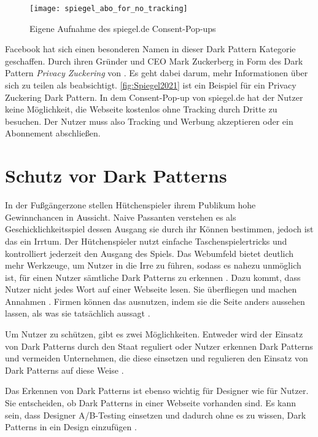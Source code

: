 \documentclass[conference,compsoc,final,a4paper]{IEEEtran}
\begin{document}
\begin{figure}[!ht]
  \centering
  \texttt{[image: spiegel\_abo\_for\_no\_tracking]}
  \caption{Eigene Aufnahme des spiegel.de Consent-Pop-ups~\autocite{Spiegel2021}}
  \label{fig:Spiegel2021}
\end{figure}

Facebook hat sich einen besonderen Namen in dieser Dark Pattern Kategorie geschaffen. Durch ihren Gründer und CEO Mark Zuckerberg in Form des Dark Pattern \textit{Privacy Zuckering} von \citeauthor{Brignull} \autocite{Brignull}. Es geht dabei darum, mehr Informationen über sich zu teilen als beabsichtigt. \autoref{fig:Spiegel2021} ist ein Beispiel für ein Privacy Zuckering Dark Pattern. In dem Consent-Pop-up von spiegel.de hat der Nutzer keine Möglichkeit, die Webseite kostenlos ohne Tracking durch Dritte zu besuchen. Der Nutzer muss also Tracking und Werbung akzeptieren oder ein Abonnement abschließen. 


\section{Schutz vor Dark Patterns}
In der Fußgängerzone stellen Hütchenspieler ihrem Publikum hohe Gewinnchancen in Aussicht. Naive Passanten verstehen es als Geschicklichkeitsspiel dessen Ausgang sie durch ihr Können bestimmen, jedoch ist das ein Irrtum. Der Hütchenspieler nutzt einfache Taschenspielertricks und kontrolliert jederzeit den Ausgang des Spiels. Das Webumfeld bietet deutlich mehr Werkzeuge, um Nutzer in die Irre zu führen, sodass es nahezu unmöglich ist, für einen Nutzer sämtliche Dark Patterns zu erkennen \autocite{M.Bhoot2020}. Dazu kommt, dass Nutzer nicht jedes Wort auf einer Webseite lesen. Sie überfliegen und machen Annahmen \autocite{Brignull}. Firmen können das ausnutzen, indem sie die Seite anders aussehen lassen, als was sie tatsächlich aussagt \autocite{Brignull}.

Um Nutzer zu schützen, gibt es zwei Möglichkeiten. Entweder wird der Einsatz von Dark Patterns durch den Staat reguliert oder Nutzer erkennen Dark Patterns und vermeiden Unternehmen, die diese einsetzen und regulieren den Einsatz von Dark Patterns auf diese Weise \autocite{Narayanan2020}.

Das Erkennen von Dark Patterns ist ebenso wichtig für Designer wie für Nutzer. Sie entscheiden, ob Dark Patterns in einer Webseite vorhanden sind. Es kann sein, dass Designer A/B-Testing einsetzen und dadurch ohne es zu wissen, Dark Patterns in ein Design einzufügen \autocite{Narayanan2020}.
\end{document}
